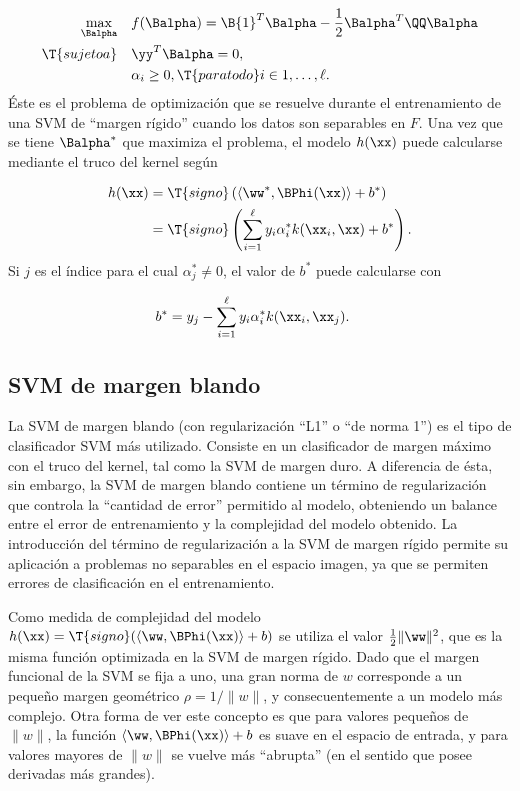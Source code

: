 \begin{align}
\begin{split}
    \max_{\Balpha} \quad
    & f(\Balpha) = \B{1}^T\Balpha-\frac{1}{2}\Balpha^T\QQ\Balpha\\
    \T{sujeto a}\quad & \yy^T\Balpha = 0, \\
                      & \alpha_i\geq 0, \T{ para todo } i\in {1,\ldots,\ell }.
\end{split}\end{align}
Éste es el problema de optimización que se resuelve durante el
entrenamiento de una SVM de ``margen rígido'' cuando los datos son
separables en $F$. Una vez que se tiene $\Balpha^*$ que maximiza el problema,
el modelo $h(\xx)$ puede calcularse mediante el truco del kernel según

\begin{align}
  \begin{split}
    h(\xx) &= \T{signo}\left(\langle\ww^*,\BPhi(\xx)\rangle+b^*\right)\\
    &= \T{signo}\left(\sum_{i=1}^\ell{}y_i\alpha^*_ik(\xx_i,\xx)+b^*\right).
  \end{split}
\label{eq:svm-model-hard}
\end{align}
Si $j$ es el índice para el cual $\alpha^*_j\neq0$, el valor de $b^*$
puede calcularse con

\begin{align}
    b^* &= y_j - \sum_{i=1}^\ell{}y_i\alpha^*_ik(\xx_i,\xx_j).
\end{align}

\subsection{SVM de margen blando}
La SVM de margen blando (con regularización ``L1'' o ``de norma 1'')
es el tipo de clasificador SVM más utilizado.  Consiste en un
clasificador de margen máximo con el truco del kernel, tal como la SVM
de margen duro. A diferencia de ésta, sin embargo, la SVM de margen
blando contiene un término de regularización que controla la
``cantidad de error'' permitido al modelo, obteniendo un balance entre
el error de entrenamiento y la complejidad del modelo obtenido.  La
introducción del término de regularización a la SVM de margen rígido
permite su aplicación a problemas no separables en el espacio imagen,
ya que se permiten errores de clasificación en el entrenamiento.

Como medida de complejidad del modelo
$h(\xx)=\T{signo}(\langle{}\ww,\BPhi(\xx)\rangle{}+b)$
se utiliza el valor $\frac{1}{2}\|\ww\|^2$, que es la misma función optimizada en
la SVM de margen rígido. Dado que el margen funcional
de la SVM se fija a uno, una gran norma de $w$ corresponde a un
pequeño margen geométrico $\rho=1/\|w\|$, y consecuentemente a un modelo más complejo.
Otra forma de ver este concepto es que para valores pequeños de
$\|w\|$, la función $\langle{}\ww,\BPhi(\xx)\rangle+b$ es suave en el
espacio de entrada, y para valores mayores de $\|w\|$ se vuelve más
``abrupta'' (en el sentido que posee derivadas más grandes).

